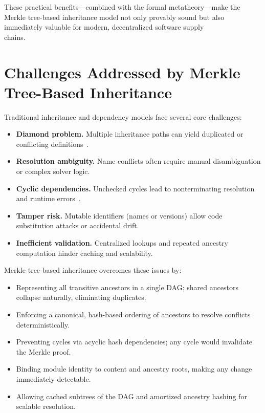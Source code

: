 \documentclass[sigplan,screen]{acmart}
\begin{document}
These practical benefits—combined with the formal metatheory—make the Merkle tree-based inheritance model not only provably sound but also immediately valuable for modern, decentralized software supply \\chains.  

\section{Challenges Addressed by Merkle Tree-Based Inheritance}
\label{sec:challenges}

Traditional inheritance and dependency models face several core challenges:

\begin{itemize}
	\item \textbf{Diamond problem.} Multiple inheritance paths can yield duplicated or conflicting definitions~\cite{snyder1986}. 
	\item \textbf{Resolution ambiguity.} Name conflicts often require manual disambiguation or complex solver logic.
	\item \textbf{Cyclic dependencies.} Unchecked cycles lead to nonterminating resolution and runtime errors~\cite{benet2014}.
	\item \textbf{Tamper risk.} Mutable identifiers (names or versions) allow code substitution attacks or accidental drift.
	\item \textbf{Inefficient validation.} Centralized lookups and repeated ancestry computation hinder caching and scalability.
\end{itemize}

Merkle tree-based inheritance overcomes these issues by:

\begin{itemize}
	\item Representing all transitive ancestors in a single DAG; shared ancestors collapse naturally, eliminating duplicates.
	\item Enforcing a canonical, hash-based ordering of ancestors to resolve conflicts deterministically.
	\item Preventing cycles via acyclic hash dependencies; any cycle would invalidate the Merkle proof.
	\item Binding module identity to content and ancestry roots, making any change immediately detectable.
	\item Allowing cached subtrees of the DAG and amortized ancestry hashing for scalable resolution.
\end{itemize}
\end{document}
